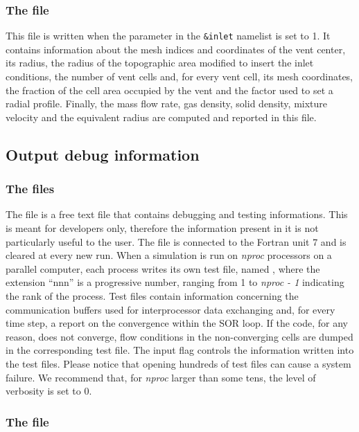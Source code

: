 \subsubsection{The  file}
This file is written when the  parameter in the
{\tt \&inlet} namelist is set to 1. It contains information
about the mesh indices and coordinates of the vent center,
its radius, the radius of the topographic area modified to
insert the inlet conditions, the number of vent cells and,
for every vent cell, its mesh coordinates, the fraction of
the cell area occupied by the vent and the factor used to
set a radial profile.
Finally, the mass flow rate, gas density, solid density, 
mixture velocity and the equivalent radius are computed and 
reported in this file. 

\subsection{Output debug information}

\subsubsection{The  files}

The file  is a free text file that contains debugging
and testing informations. This is meant for developers only,
therefore the information present in it is not particularly useful to the 
user.
The file is connected to the Fortran unit 7 and is cleared at every new run.
When a simulation is run on {\em nproc} processors on a parallel computer, 
each process writes its own test file, named , where
the extension ``nnn'' is a progressive number, ranging from 1 to {\em nproc - 1}
indicating the rank of the process. 
Test files contain information concerning the communication buffers used
for interprocessor data exchanging and, for every time step, a report
on the convergence within the SOR loop. 
If the code, for any reason, does not converge,
flow conditions in the non-converging cells are dumped in the
corresponding test file.
The input flag  controls the information written into the test files. 
Please notice that opening hundreds
of test files can cause a system failure. We recommend that, for {\em nproc}
larger than some tens, the level of verbosity is set to 0.

\subsubsection{The  file}

